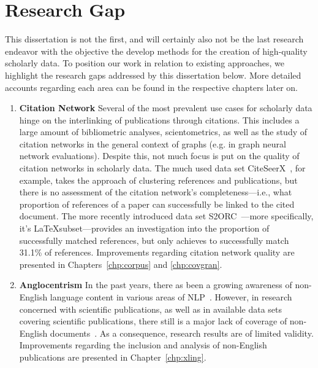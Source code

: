 
\section{Research Gap}\label{sec:intro-gap}

This dissertation is not the first, and will certainly also not be the last research endeavor with the objective the develop methods for the creation of high-quality scholarly data. To position our work in relation to existing approaches, we highlight the research gaps addressed by this dissertation below. More detailed accounts regarding each area can be found in the respective chapters later on.

\begin{enumerate}
    \item \textbf{Citation Network} Several of the most prevalent use cases for scholarly data hinge on the interlinking of publications through citations. This includes a large amount of bibliometric analyses, scientometrics, as well as the study of citation networks in the general context of graphs (e.g. in graph neural network evaluations). Despite this, not much focus is put on the quality of citation networks in scholarly data. The much used data set CiteSeerX~\cite{Wu2015,Wu2016,Patel2021}, for example, takes the approach of clustering references and publications, but there is no assessment of the citation network's completeness---i.e., what proportion of references of a paper can successfully be linked to the cited document. The more recently introduced data set S2ORC~\cite{Lo2020}---more specifically, it's \LaTeX subset---provides an investigation into the proportion of successfully matched references, but only achieves to successfully match 31.1\% of references. Improvements regarding citation network quality are presented in Chapters~\ref{chp:corpus} and \ref{chp:covgran}.
    \item \textbf{Anglocentrism} In the past years, there as been a growing awareness of non-English language content in various areas of NLP~\cite{Dabre2020,Yu2022,Ramesh2023}. However, in research concerned with scientific publications, as well as in available data sets covering scientific publications, there still is a major lack of coverage of non-English documents~\cite{Vera-Baceta2019,Liu2019,Moed2018,Moskaleva2019,MartinMartin2021}. As a consequence, research results are of limited validity. Improvements regarding the inclusion and analysis of non-English publications are presented in Chapter~\ref{chp:xling}.

\end{enumerate}
